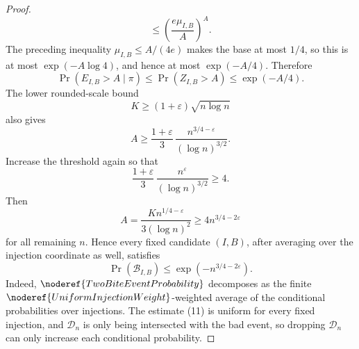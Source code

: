 \begin{proof}
\[\le \left(\frac{e\mu_{I,B}}{A}\right)^A .
\]
The preceding inequality \(\mu_{I,B}\le A/(4e)\) makes the base at most
\(1/4\), so this is at most \(\exp(-A\log 4)\), and hence at most
\(\exp(-A/4)\).  Therefore
\[
\Pr(E_{I,B}>A\mid\pi)
\le \Pr(Z_{I,B}>A)
\le \exp(-A/4). \tag{11}
\]
The lower rounded-scale bound
\[
K\ge(1+\varepsilon)\sqrt{n\log n}
\]
also gives
\[
A
\ge \frac{1+\varepsilon}{3}\,
  \frac{n^{3/4-\varepsilon}}{(\log n)^{3/2}}.
\]
Increase the threshold again so that
\[
\frac{1+\varepsilon}{3}\,
  \frac{n^\varepsilon}{(\log n)^{3/2}}\ge 4.
\]
Then
\[
A=\frac{K n^{1/4-\varepsilon}}{3(\log n)^2}
\ge 4 n^{3/4-2\varepsilon}
\]
for all remaining \(n\).  Hence every fixed candidate \((I,B)\), after
averaging over the injection coordinate as well, satisfies
\[
\Pr(\mathcal B_{I,B})
\le \exp(-n^{3/4-2\varepsilon}). \tag{12}
\]
Indeed, \(\noderef{TwoBiteEventProbability}\) decomposes as the finite
\(\noderef{UniformInjectionWeight}\)-weighted average of the conditional
probabilities over injections.  The estimate (11) is uniform for every fixed
injection, and \(\mathcal D_n\) is only being intersected with the bad event,
so dropping \(\mathcal D_n\) can only increase each conditional probability.


\end{proof}
